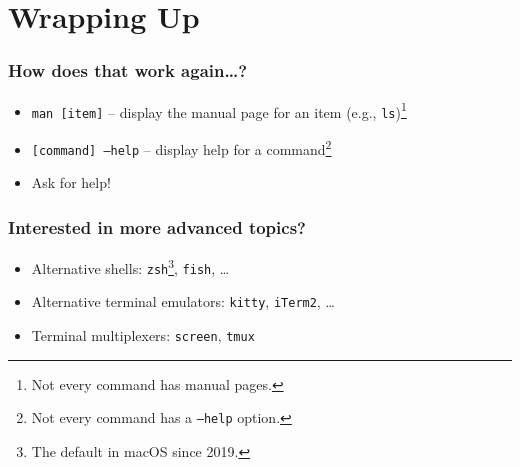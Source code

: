 \documentclass[aspectratio=169]{beamer}
\begin{document}
\section{Wrapping Up}

\frame{\sectionpage}

\begin{frame}
	\frametitle{How does that work again\dots?}
	\begin{itemize}
		\item \texttt{man [item]} -- display the manual page for an item (e.g., \texttt{ls})\footnote{Not every command has manual pages.}
		\item \texttt{[command] --help} -- display help for a command\footnote{Not every command has a \texttt{--help} option.}
		\item Ask for help!
	\end{itemize}
\end{frame}

\begin{frame}
	\frametitle{Interested in more advanced topics?}
	\begin{itemize}
		\item Alternative shells: \texttt{zsh}\footnote{The default in macOS since 2019.}, \texttt{fish}, \dots
		\item Alternative terminal emulators: \texttt{kitty}, \texttt{iTerm2}, \dots
		\item Terminal multiplexers: \texttt{screen}, \texttt{tmux}
	\end{itemize}
\end{frame}
\end{document}
